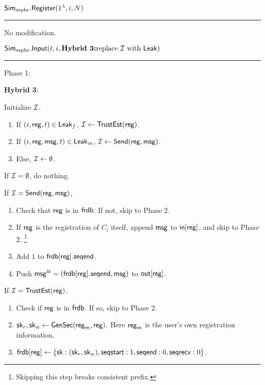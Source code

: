 
\vspace{10pt}

$\mathbf{\mathsf{Sim}_{\text{asphr}}.\mathsf{Register}}(1^{\lambda}, i, N)$
\vspace{5pt}
\hrule
\vspace{5pt}
No modification.
\vspace{10pt}

$\mathbf{\mathsf{Sim}_{\text{asphr}}.\mathsf{Input}}(t, i, { \textbf{Hybrid 3:} \text{replace $\mathcal{I}$ with $\mathsf{Leak}$}})$
\vspace{5pt}
\hrule
\vspace{5pt}
Phase 1: 

\begin{siderule}
{
 

\textbf{Hybrid 3}:

Initialize $\mathcal{I}$.

\begin{enumerate}
    \item If $(i, \mathsf{reg}, t) \in \mathsf{Leak}_f$, $\mathcal{I} \leftarrow \mathsf{TrustEst}(\mathsf{reg})$.
    \item If $(i, \mathsf{reg}, \mathsf{msg}, t) \in \mathsf{Leak}_m$, $\mathcal{I} \leftarrow \mathsf{Send}(\mathsf{reg}, \mathsf{msg})$.
    \item Else, $\mathcal{I} \leftarrow \emptyset$.
\end{enumerate}

}
\end{siderule}

If $\mathcal{I} = \emptyset$, do nothing. 

If $\mathcal{I} = \mathsf{Send}(\mathsf{reg}, \mathsf{msg})$, 

\begin{enumerate}
    \item Check that $\mathsf{reg}$ is in $\mathsf{frdb}$. If not, skip to Phase 2.
    \item If $\mathsf{reg}$ is the registration of $C_i$ itself, append $\mathsf{msg}$ to $\mathsf{in}[\mathsf{reg}]$, and skip to Phase 2. \footnote{Skipping this step breaks consistent prefix.}
    \item Add $1$ to $\mathsf{frdb}[\mathsf{reg}].\mathsf{seqend}$. 
    \item Push $\mathsf{msg}^{lb} = (\mathsf{frdb}[\mathsf{reg}].\mathsf{seqend}, \mathsf{msg})$ to $\mathsf{out}[\mathsf{reg}]$.
\end{enumerate}

If $\mathcal{I} = \mathsf{TrustEst}(\mathsf{reg})$.
\begin{enumerate}
    \item Check if $\mathsf{reg}$ is in $\mathsf{frdb}$. If so, skip to Phase 2.
    \item ${\mathsf{sk}}_r, {\mathsf{sk}}_w \leftarrow \mathsf{GenSec}(\mathsf{reg}_m, \mathsf{reg}).$ Here $\mathsf{reg}_m$ is the user's own registration information.
    \item $\mathsf{frdb}[\mathsf{reg}] \leftarrow \{{\mathsf{sk}}: ({\mathsf{sk}}_r, {\mathsf{sk}}_w),  \mathsf{seqstart}: 1, \mathsf{seqend}: 0, \quad \\ \mathsf{seqrecv}: 0\}$.
\end{enumerate}

